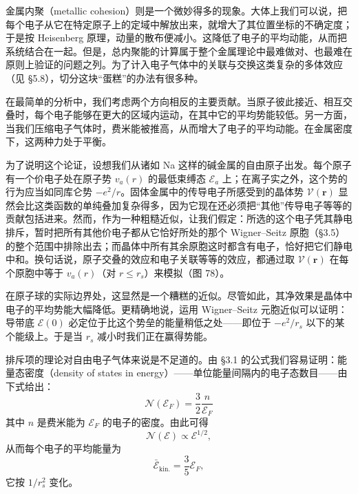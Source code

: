 
金属内聚（metallic cohesion）则是一个微妙得多的现象。大体上我们可以说，把每个电子从它在特定原子上的定域中解放出来，就增大了其位置坐标的不确定度；于是按 Heisenberg 原理，动量的散布便减小。这降低了电子的平均动能，从而把系统结合在一起。但是，总内聚能的计算属于整个金属理论中最难做对、也最难在原则上验证的问题之列。为了计入电子气体中的关联与交换这类复杂的多体效应（见 §5.8），切分这块“蛋糕”的办法有很多种。

在最简单的分析中，我们考虑两个方向相反的主要贡献。当原子彼此接近、相互交叠时，每个电子能够在更大的区域内运动，在其中它的平均势能较低。另一方面，当我们压缩电子气体时，费米能被推高，从而增大了电子的平均动能。在金属密度下，这两种力处于平衡。


为了说明这个论证，设想我们从诸如 Na 这样的碱金属的自由原子出发。每个原子有一个价电子处在原子势 $v_{a}(r)$ 的最低束缚态 $\mathcal{E}_{a}$ 上；在离子实之外，这个势的行为应当如同库仑势 $-e^{2}/r$。固体金属中的传导电子所感受到的晶体势 $\mathcal{V}(\mathbf{r})$ 显然会比这类函数的单纯叠加复杂得多，因为它现在还必须把“其他”传导电子等等的贡献包括进来。然而，作为一种粗糙近似，让我们假定：所选的这个电子凭其静电排斥，暂时把所有其他价电子都从它恰好所处的那个 Wigner–Seitz 原胞（§3.5）的整个范围中排除出去；而晶体中所有其余原胞这时都含有电子，恰好把它们静电中和。换句话说，原子交叠的效应和电子关联等等的效应，都通过取 $\mathcal{V}(\mathbf{r})$ 在每个原胞中等于 $v_{a}(r)$（对 $r\leqslant r_{s}$）来模拟（图 78）。

在原子球的实际边界处，这显然是一个糟糕的近似。尽管如此，其净效果是晶体中电子的平均势能大幅降低。更精确地说，运用 Wigner–Seitz 元胞近似可以证明：导带底 $\mathcal{E}(0)$ 必定位于比这个势垒的能量稍低之处——即位于 $-e^{2}/r_{s}$ 以下的某个能级上。于是当 $r_{s}$ 减小时我们正在赢得势能。

排斥项的理论对自由电子气体来说是不足道的。由 §3.1 的公式我们容易证明：能量态密度（density of states in energy）——单位能量间隔内的电子态数目——由下式给出：
\begin{equation*}
\mathcal{N}(\mathcal{E}_{F})=\frac{3}{2}\frac{n}{\mathcal{E}_{F}}
\tag{4.3}
\end{equation*}
其中 $n$ 是费米能为 $\mathcal{E}_{F}$ 的电子的密度。由此可得
\begin{equation*}
\mathcal{N}(\mathcal{E})\propto\mathcal{E}^{1/2},
\tag{4.4}
\end{equation*}
从而每个电子的平均能量为
\begin{equation*}
\bar{\mathcal{E}}_{\text{kin.}}=\frac{3}{5}\mathcal{E}_{F},
\tag{4.5}
\end{equation*}
它按 $1/r_{s}^{2}$ 变化。

